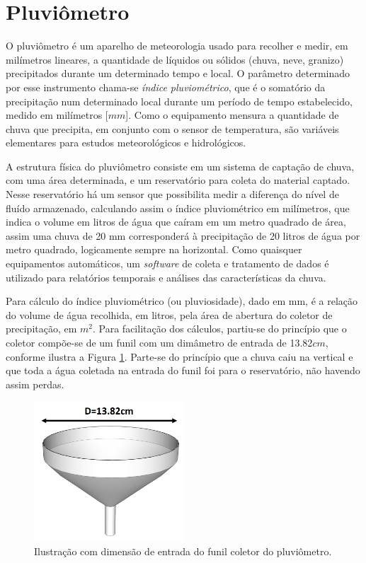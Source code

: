 \documentclass[a4paper]{instrumentacao}
\begin{document}
\section{Pluviômetro}
O pluviômetro é um aparelho de meteorologia usado para recolher e medir, em milímetros lineares, a quantidade de líquidos ou sólidos (chuva, neve, granizo) precipitados durante um determinado tempo e local. O parâmetro determinado por esse instrumento chama-se \textit{índice pluviométrico}, que é o somatório da precipitação num determinado local durante um período de tempo estabelecido, medido em milímetros [$mm$]. Como o equipamento mensura a quantidade de chuva que precipita, em conjunto com o sensor de temperatura, são variáveis elementares para estudos meteorológicos e hidrológicos.

A estrutura física do pluviômetro consiste em um sistema de captação de chuva, com uma área determinada, e um reservatório para coleta do material captado. Nesse reservatório há um sensor que possibilita medir a diferença do nível de fluído armazenado, calculando assim o índice pluviométrico em milímetros, que indica o volume em litros de água que caíram em um metro quadrado de área, assim uma chuva de 20 mm corresponderá à precipitação de 20 litros de água por metro quadrado, logicamente sempre na horizontal. Como quaisquer equipamentos automáticos, um \textit{software} de coleta e tratamento de dados é utilizado para relatórios temporais e análises das características da chuva.

Para cálculo do índice pluviométrico (ou pluviosidade), dado em mm, é a relação do volume de água recolhida, em litros, pela área de abertura do coletor de precipitação, em $m^2$. Para facilitação dos cálculos, partiu-se do princípio que o coletor compõe-se de um funil com um dimâmetro de entrada de 13.82$cm$, conforme ilustra a Figura \ref{fig:pluviometro-funil}. Parte-se do princípio que a chuva caiu na vertical e que toda a água coletada na entrada do funil foi para o reservatório, não havendo assim perdas.

\begin{figure}[H]
	\centering \includegraphics[width=0.5\textwidth]{pluviometro_funil.jpg}
	\caption{Ilustração com dimensão de entrada do funil coletor do pluviômetro.}
	\label{fig:pluviometro-funil}
\end{figure}
\end{document}
